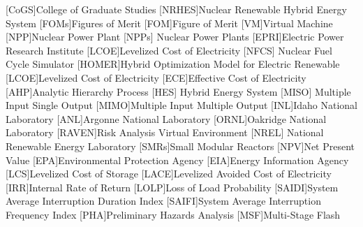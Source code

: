 \documentclass[12pt]{UIdahoMastersThesis}
\begin{document}
\begin{acronym}[NRHES]  %
    [CoGS]{College of Graduate Studies}
    [NRHES]{Nuclear Renewable Hybrid Energy System}
    [FOMs]{Figures of Merit}
    [FOM]{Figure of Merit}
    [VM]{Virtual Machine}  %
    [NPP]{Nuclear Power Plant}
    [NPPs] {Nuclear Power Plants}
    [EPRI]{Electric Power Research Institute}
     [LCOE]{Levelized Cost of Electricity}
    [NFCS] {Nuclear Fuel Cycle Simulator}
    [HOMER]{Hybrid Optimization Model for Electric Renewable}
    [LCOE]{Levelized Cost of Electricity}
    [ECE]{Effective Cost of Electricity}
    [AHP]{Analytic Hierarchy Process}
    [HES] {Hybrid Energy System}
    [MISO] {Multiple Input Single Output}
    [MIMO]{Multiple Input Multiple Output}
    [INL]{Idaho National Laboratory}
    [ANL]{Argonne National Laboratory}
    [ORNL]{Oakridge National Laboratory}
    [RAVEN]{Risk Analysis Virtual Environment}
     [NREL] {National Renewable Energy Laboratory}
    [SMRs]{Small Modular Reactors}
    [NPV]{Net Present Value}
    [EPA]{Environmental Protection Agency}
    [EIA]{Energy Information Agency}
    [LCS]{Levelized Cost of Storage}
    [LACE]{Levelized Avoided Cost of Electricity}
    [IRR]{Internal Rate of Return}
    [LOLP]{Loss of Load Probability}
    [SAIDI]{System Average Interruption Duration Index}
    [SAIFI]{System Average Interruption Frequency Index}
    [PHA]{Preliminary Hazards Analysis}
    [MSF]{Multi-Stage Flash}

\end{acronym}



\mainmatter  %
\setcounter{secnumdepth}{3}  %
\end{document}
